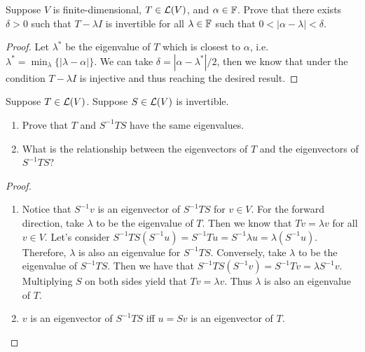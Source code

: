 \documentclass{extarticle}
\begin{document}
\begin{problem}{11}
    Suppose \(V\) is finite-dimensional, \(T \in \mathcal{L}(V)\), and \(\alpha \in \mathbb{F}\). Prove that 
    there exists \(\delta > 0\) such that \(T - \lambda I\) is invertible for all \(\lambda \in \mathbb{F}\)
    such that \(0 < |\alpha - \lambda| < \delta\).
\end{problem}

\begin{proof}
Let \(\lambda^*\) be the eigenvalue of \(T\) which is closest to \(\alpha\), i.e. \(\lambda^* = \min_\lambda\{
    |\lambda - \alpha|\}\). We can take \(\delta = |\alpha - \lambda^*|/2\), then we know that 
    under the condition \(T - \lambda I\) is injective and thus reaching the desired result. 
\end{proof}

\begin{problem}{13}
    Suppose \(T \in \mathcal{L}(V)\). Suppose \(S \in \mathcal{L}(V)\) is invertible. 
    \begin{enumerate}[label=(\alph*)]
        \item Prove that \(T\) and \(S^{-1}TS\) have the same eigenvalues. 
        \item What is the relationship between the eigenvectors of \(T\) and the eigenvectors of \(S^{-1}TS\)?
    \end{enumerate}
\end{problem}

\begin{proof}
\begin{enumerate}[label=(\alph*)]
    \item Notice that \(S^{-1}v\) is an eigenvector of \(S^{-1}TS\) for \(v \in V\). For the
    forward direction, take \(\lambda\) to be the eigenvalue of \(T\). Then we know that \(Tv = 
    \lambda v\) for all \(v \in V\). Let's consider \(S^{-1}TS (S^{-1}u) = S^{-1}Tu = S^{-1} \lambda u 
    = \lambda (S^{-1} u)\). Therefore, \(\lambda\) is also an eigenvalue for \(S^{-1}TS\). 
    Conversely, take \(\lambda\) to be the eigenvalue of \(S^{-1}TS\). Then we have that 
    \(S^{-1}TS (S^{-1}v) = S^{-1}Tv = \lambda S^{-1}v\). Multiplying \(S\) on both sides yield 
    that \(Tv = \lambda v\). Thus \(\lambda\) is also an eigenvalue of \(T\). 
    
    \item  \(v\) is an eigenvector of \(S^{-1}TS\) iff \(u = Sv\) is an eigenvector of \(T\).
\end{enumerate}
\end{proof}
\end{document}
